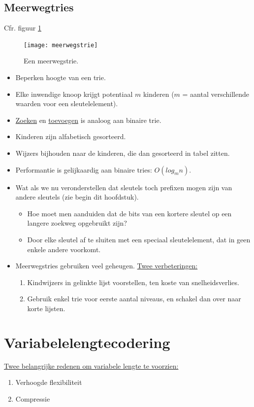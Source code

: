 \documentclass{report}
\begin{document}
\subsection{Meerwegtries}
Cfr. figuur \ref{fig:meerwegstrie}
\begin{figure}[ht]
	\centering
	\texttt{[image: meerwegstrie]}
	\caption{Een meerwegstrie.}
	\label{fig:meerwegstrie}
\end{figure}
\begin{itemize}
	\item[\good] Beperken hoogte van een trie.
	\item[\info] Elke inwendige knoop krijgt potentiaal $m$ kinderen ($m$ = aantal verschillende waarden voor een sleutelelement).
	\item[\info] \underline{Zoeken} en \underline{toevoegen} is analoog aan binaire trie.
	\item[\good] Kinderen zijn alfabetisch gesorteerd.
	\item[\info] Wijzers bijhouden naar de kinderen, die dan gesorteerd in tabel zitten.
	\item[\info] Performantie is gelijkaardig aan binaire tries: $O(log_m n)$.
	\item[\alert] Wat als we nu veronderstellen dat sleutels toch prefixen mogen zijn van andere sleutels (zie begin dit hoofdstuk).
	\begin{itemize}
		\item[\alert] Hoe moet men aanduiden dat de bits van een kortere sleutel op een langere zoekweg opgebruikt zijn?
		\item[$\rightarrow$ ] Door elke sleutel af te sluiten met een speciaal sleutelelement, dat in geen enkele andere voorkomt.
	\end{itemize}
	\item[\alert] Meerwegstries gebruiken veel geheugen. \underline{Twee verbeteringen:}
	\begin{enumerate}
		\item Kindwijzers in gelinkte lijst voorstellen, ten koste van snelheidsverlies.
		\item Gebruik enkel trie voor eerste aantal niveaus, en schakel dan over naar korte lijsten.
	\end{enumerate}
\end{itemize}



\section{Variabelelengtecodering}
\underline{Twee belangrijke redenen om variabele lengte te voorzien:}
\begin{enumerate}
	\item Verhoogde flexibiliteit
	\item Compressie
\end{enumerate}
\end{document}
